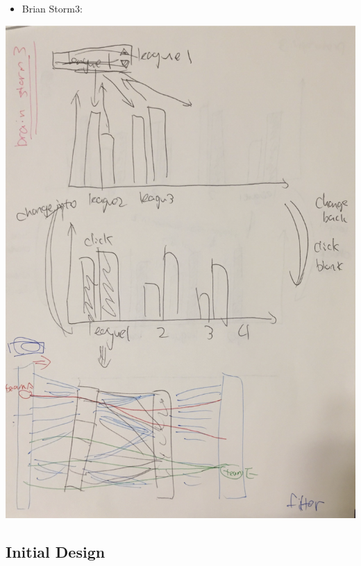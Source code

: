 \documentclass[11pt]{article}
\begin{document}
\begin{itemize}
\item Brian Storm3:
\end{itemize}
\includegraphics[width=.9\linewidth]{Design3.png}
\subsection{Initial Design}
\label{sec-4-2}
\end{document}
